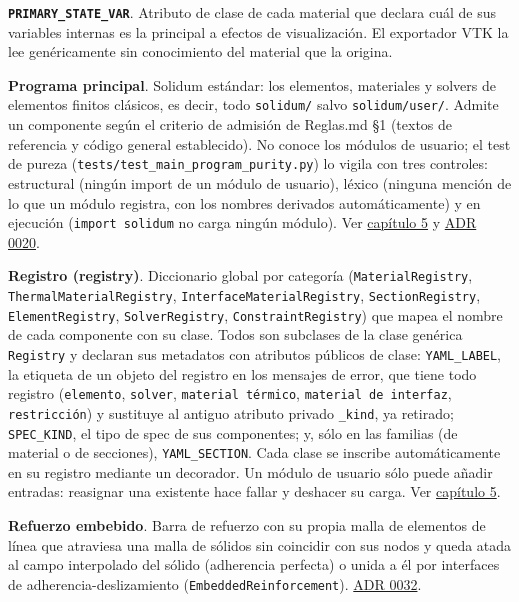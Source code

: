 \documentclass[11pt,oneside]{report}
\begin{document}
\textbf{\texttt{PRIMARY\_\allowbreak{}STATE\_\allowbreak{}VAR}}. Atributo de clase de cada material que declara cuál de sus variables internas es la principal a efectos de visualización. El exportador VTK la lee genéricamente sin conocimiento del material que la origina.

\textbf{Programa principal}. Solidum estándar: los elementos, materiales y solvers de elementos finitos clásicos, es decir, todo \texttt{solidum/} salvo \texttt{solidum/user/}. Admite un componente según el criterio de admisión de Reglas.md §1 (textos de referencia y código general establecido). No conoce los módulos de usuario; el test de pureza (\texttt{tests/\allowbreak{}test\_\allowbreak{}main\_\allowbreak{}program\_\allowbreak{}purity.\allowbreak{}py}) lo vigila con tres controles: estructural (ningún import de un módulo de usuario), léxico (ninguna mención de lo que un módulo registra, con los nombres derivados automáticamente) y en ejecución (\texttt{import solidum} no carga ningún módulo). Ver \hyperref[cap:5]{capítulo 5} y \hyperref[adr:0020]{ADR 0020}.

\textbf{Registro (registry)}. Diccionario global por categoría (\texttt{MaterialRegistry}, \texttt{ThermalMaterialRegistry}, \texttt{InterfaceMaterialRegistry}, \texttt{SectionRegistry}, \texttt{ElementRegistry}, \texttt{SolverRegistry}, \texttt{ConstraintRegistry}) que mapea el nombre de cada componente con su clase. Todos son subclases de la clase genérica \texttt{Registry} y declaran sus metadatos con atributos públicos de clase: \texttt{YAML\_LABEL}, la etiqueta de un objeto del registro en los mensajes de error, que tiene todo registro (\texttt{\textquotedbl{}elemento\textquotedbl{}}, \texttt{\textquotedbl{}solver\textquotedbl{}}, \texttt{\textquotedbl{}material térmico\textquotedbl{}}, \texttt{\textquotedbl{}material de interfaz\textquotedbl{}}, \texttt{\textquotedbl{}restricción\textquotedbl{}}) y sustituye al antiguo atributo privado \texttt{\_kind}, ya retirado; \texttt{SPEC\_KIND}, el tipo de spec de sus componentes; y, sólo en las familias (de material o de secciones), \texttt{YAML\_SECTION}. Cada clase se inscribe automáticamente en su registro mediante un decorador. Un módulo de usuario sólo puede añadir entradas: reasignar una existente hace fallar y deshacer su carga. Ver \hyperref[cap:5]{capítulo 5}.

\textbf{Refuerzo embebido}. Barra de refuerzo con su propia malla de elementos de línea que atraviesa una malla de sólidos sin coincidir con sus nodos y queda atada al campo interpolado del sólido (adherencia perfecta) o unida a él por interfaces de adherencia-deslizamiento (\texttt{EmbeddedReinforcement}). \hyperref[adr:0032]{ADR 0032}.
\end{document}
